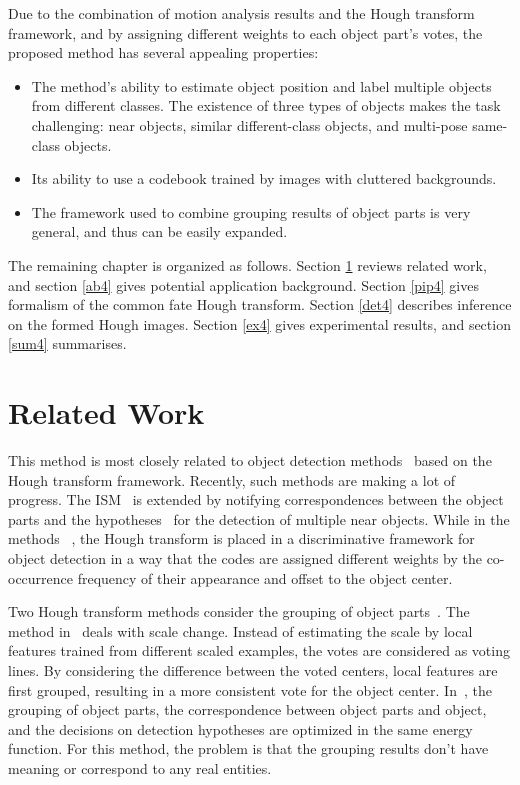 Due to the combination of motion analysis results and the Hough transform framework, and by assigning different weights to each object part's votes, the proposed method has several appealing properties:
\begin{itemize}
\item {The method's ability to estimate object position and label multiple objects from different classes. The existence of three types of objects makes the task challenging: near objects, similar different-class objects, and multi-pose same-class objects.}
\item {Its ability to use a codebook trained by images with cluttered backgrounds.}
\item {The framework used to combine grouping results of object parts is very general, and thus can be easily expanded.}
\end{itemize}


The remaining chapter is organized as follows. Section \ref{rw4} reviews related work, and section \ref{ab4} gives potential application background. Section \ref{pip4}  gives formalism of the common fate Hough transform. Section \ref{det4} describes inference on the formed Hough images. Section \ref{ex4} gives experimental results, and section \ref{sum4} summarises.

\section{Related Work}
\label{rw4}

This method is most closely related to object detection methods~\citep{ac9,ac22,lb1,ac5,ac10,ac21} based on the Hough transform framework. Recently, such methods are making a lot of  progress. The ISM~\citep{lb1,ac5} is extended  by notifying correspondences between the object parts and the hypotheses~\citep{ac9} for the detection of multiple near objects. While in the methods ~\citep{ac6,ac10,ac7}, the Hough transform is placed in a discriminative framework for object detection in a way that the codes are assigned different weights by the co-occurrence frequency of their appearance and offset to the object center.

Two Hough transform methods consider the grouping of object parts~\citep{ac26,ac25}. The method in~\citep{ac26} deals with scale change. Instead of estimating the scale by local features trained from different scaled examples, the votes are considered as voting lines. By considering the difference between the voted centers, local features are first grouped, resulting in a more consistent vote for the object center. In~\citep{ac25}, the grouping of object parts, the correspondence between object parts and object, and the decisions on detection hypotheses are optimized in the same energy function. For this method, the problem is that the grouping results don't have meaning or correspond to any real entities.


